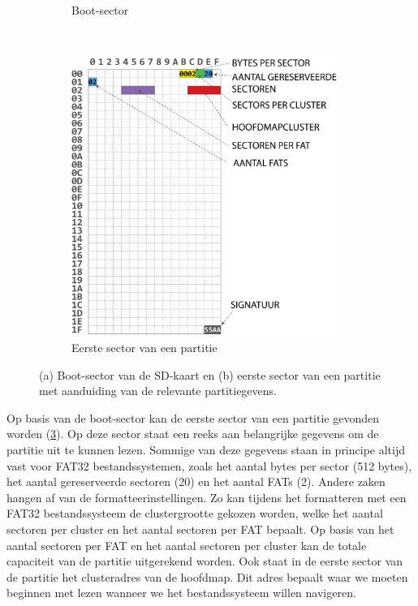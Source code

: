 \begin{figure}[h!]
\begin{subfigure}[t]{0.3\textwidth}
        \caption{Boot-sector}
        \label{fig:boot-sector}
    \end{subfigure}%
    ~ 
    \begin{subfigure}[t]{0.7\textwidth}
        \centering
        \includegraphics[width=0.95\textwidth]{img/volume-id.png}
        \caption{Eerste sector van een partitie}
        \label{fig:volume-id}
    \end{subfigure}
    \caption{(a) Boot-sector van de SD-kaart en (b) eerste sector van een partitie met aanduiding van de relevante partitiegevens.}
\end{figure}

Op basis van de boot-sector kan de eerste sector van een partitie gevonden worden (\cref{fig:volume-id}). Op deze sector staat een reeks aan belangrijke gegevens om de partitie uit te kunnen lezen. Sommige van deze gegevens staan in principe altijd vast voor FAT32 bestandssystemen, zoals het aantal bytes per sector (512 bytes), het aantal gereserveerde sectoren (20) en het aantal FATs (2). Andere zaken hangen af van de formatteerinstellingen. Zo kan tijdens het formatteren met een FAT32 bestandssysteem de clustergrootte gekozen worden, welke het aantal sectoren per cluster en het aantal sectoren per FAT bepaalt. Op basis van het aantal sectoren per FAT en het aantal sectoren per cluster kan de totale capaciteit van de partitie uitgerekend worden. Ook staat in de eerste sector van de partitie het clusteradres van de hoofdmap. Dit adres bepaalt waar we moeten beginnen met lezen wanneer we het bestandssysteem willen navigeren.

